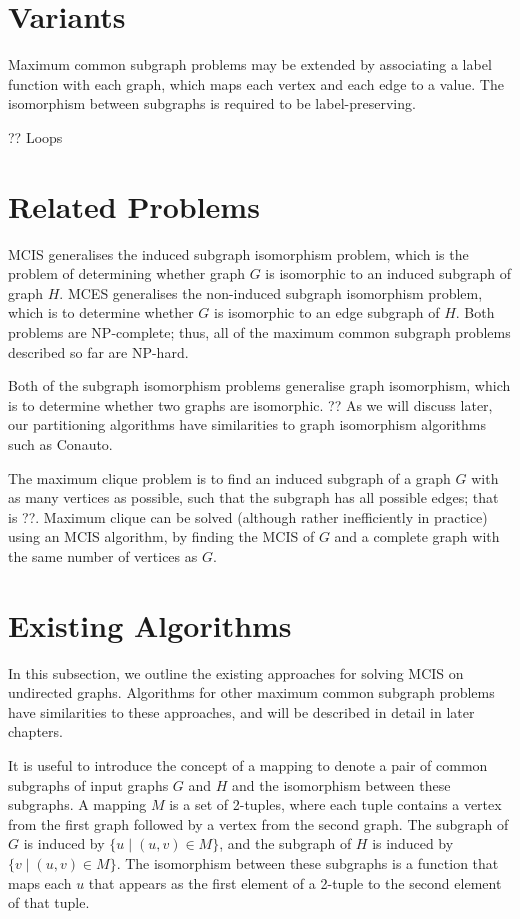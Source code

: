 \section{Variants}

Maximum common subgraph problems may be extended by associating a label
function with each graph, which maps each vertex and each edge to a value. The
isomorphism between subgraphs is required to be label-preserving.

?? Loops

\section{Related Problems}

MCIS generalises the induced subgraph isomorphism problem, which is the problem
of determining whether graph $G$ is isomorphic to an induced subgraph of graph $H$.
MCES generalises the non-induced subgraph isomorphism problem, which is to
determine whether $G$ is isomorphic to an edge subgraph of $H$. Both problems are
NP-complete; thus, all of the maximum common subgraph problems described so far
are NP-hard.

Both of the subgraph isomorphism problems generalise graph isomorphism, which
is to determine whether two graphs are isomorphic. ?? As we will discuss later,
our partitioning algorithms have similarities to graph isomorphism algorithms
such as Conauto.

The maximum clique problem is to find an induced subgraph of a graph $G$ with as
many vertices as possible, such that the subgraph has all possible edges; that
is ??. Maximum clique can be solved (although rather inefficiently in practice)
using an MCIS algorithm, by finding the MCIS of $G$ and a complete graph with the
same number of vertices as $G$.

\section{Existing Algorithms}

In this subsection, we outline the existing approaches for solving MCIS on
undirected graphs. Algorithms for other maximum common subgraph problems have
similarities to these approaches, and will be described in detail in later
chapters.

It is useful to introduce the concept of a mapping to denote a pair of common
subgraphs of input graphs $G$ and $H$ and the isomorphism between these subgraphs.
A mapping $M$ is a set of 2-tuples, where each tuple contains a vertex from the
first graph followed by a vertex from the second graph. The subgraph of $G$ is
induced by $\{u \mid (u, v) \in M\}$, and the subgraph of $H$ is induced by $\{v \mid (u, v)
\in M\}$. The isomorphism between these subgraphs is a function that maps each $u$
that appears as the first element of a 2-tuple to the second element of that
tuple.

